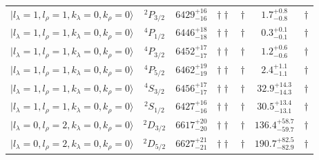 \begin{tabular}{c c| c c c c c }
$\vert l_{\lambda}\!\!=\!1, l_{\rho}\!\!=\!1, k_{\lambda}\!\!=\!0, k_{\rho}\!\!=\!0 \rangle$ & $^{2}P_{3/2}$ & $6429^{+16}_{-16}$ & $\dagger\dagger$ & $\dagger$ & $1.7^{+0.8}_{-0.8}$ & $\dagger$ \\ 
$\vert l_{\lambda}\!\!=\!1, l_{\rho}\!\!=\!1, k_{\lambda}\!\!=\!0, k_{\rho}\!\!=\!0 \rangle$ & $^{4}P_{1/2}$ & $6446^{+18}_{-18}$ & $\dagger\dagger$ & $\dagger$ & $0.3^{+0.1}_{-0.1}$ & $\dagger$ \\ 
$\vert l_{\lambda}\!\!=\!1, l_{\rho}\!\!=\!1, k_{\lambda}\!\!=\!0, k_{\rho}\!\!=\!0 \rangle$ & $^{4}P_{3/2}$ & $6452^{+17}_{-17}$ & $\dagger\dagger$ & $\dagger$ & $1.2^{+0.6}_{-0.6}$ & $\dagger$ \\ 
$\vert l_{\lambda}\!\!=\!1, l_{\rho}\!\!=\!1, k_{\lambda}\!\!=\!0, k_{\rho}\!\!=\!0 \rangle$ & $^{4}P_{5/2}$ & $6462^{+19}_{-19}$ & $\dagger\dagger$ & $\dagger$ & $2.4^{+1.1}_{-1.1}$ & $\dagger$ \\ 
$\vert l_{\lambda}\!\!=\!1, l_{\rho}\!\!=\!1, k_{\lambda}\!\!=\!0, k_{\rho}\!\!=\!0 \rangle$ & $^{4}S_{3/2}$ & $6456^{+17}_{-17}$ & $\dagger\dagger$ & $\dagger$ & $32.9^{+14.3}_{-14.3}$ & $\dagger$ \\ 
$\vert l_{\lambda}\!\!=\!1, l_{\rho}\!\!=\!1, k_{\lambda}\!\!=\!0, k_{\rho}\!\!=\!0 \rangle$ & $^{2}S_{1/2}$ & $6427^{+16}_{-16}$ & $\dagger\dagger$ & $\dagger$ & $30.5^{+13.4}_{-13.1}$ & $\dagger$ \\ 
$\vert l_{\lambda}\!\!=\!0, l_{\rho}\!\!=\!2, k_{\lambda}\!\!=\!0, k_{\rho}\!\!=\!0 \rangle$ & $^{2}D_{3/2}$ & $6617^{+20}_{-20}$ & $\dagger\dagger$ & $\dagger$ & $136.4^{+58.7}_{-59.7}$ & $\dagger$ \\ 
$\vert l_{\lambda}\!\!=\!0, l_{\rho}\!\!=\!2, k_{\lambda}\!\!=\!0, k_{\rho}\!\!=\!0 \rangle$ & $^{2}D_{5/2}$ & $6627^{+21}_{-21}$ & $\dagger\dagger$ & $\dagger$ & $190.7^{+82.5}_{-82.9}$ & $\dagger$ \\ 
\hline \hline
\end{tabular}
